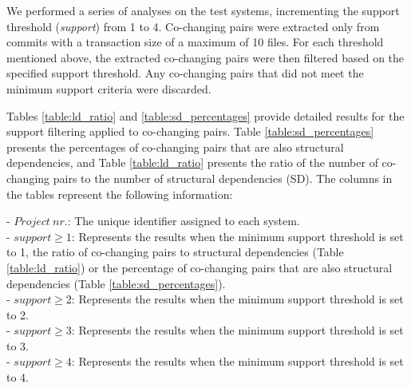 We performed a series of analyses on the test systems, incrementing the support threshold (\textit{support}) from 1 to 4. Co-changing pairs were extracted only from commits with a transaction size of a maximum of 10 files. For each threshold mentioned above, the extracted co-changing pairs were then filtered based on the specified support threshold. Any co-changing pairs that did not meet the minimum support criteria were discarded.


Tables \ref{table:ld_ratio} and \ref{table:sd_percentages} provide detailed results for the support filtering applied to co-changing pairs. Table \ref{table:sd_percentages} presents the percentages of co-changing pairs that are also structural dependencies, and Table \ref{table:ld_ratio} presents the ratio of the number of co-changing pairs to the number of structural dependencies (SD). The columns in the tables represent the following information:

\hspace{-4em}- \textit{$Project\ nr.$}: The unique identifier assigned to each system. \\
- \textit{$support\geq 1$}: Represents the results when the minimum support threshold is set to 1, the ratio of co-changing pairs to structural dependencies (Table \ref{table:ld_ratio}) or the percentage of co-changing pairs that are also structural dependencies (Table \ref{table:sd_percentages}). \\
- \textit{$support\geq 2$}: Represents the results when the minimum support threshold is set to 2. \\
- \textit{$support\geq 3$}: Represents the results when the minimum support threshold is set to 3. \\
- \textit{$support\geq 4$}: Represents the results when the minimum support threshold is set to 4.


